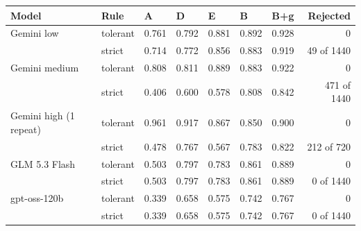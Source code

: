 \begin{tabularx}{\linewidth}{llYYYYYr}
\toprule
Model & Rule & A & D & E & B & B+g & Rejected \\
\midrule
Gemini low & tolerant & 0.761 & 0.792 & 0.881 & 0.892 & 0.928 & 0 \\
 & strict & 0.714 & 0.772 & 0.856 & 0.883 & 0.919 & 49 of 1440 \\
\addlinespace
Gemini medium & tolerant & 0.808 & 0.811 & 0.889 & 0.883 & 0.922 & 0 \\
 & strict & 0.406 & 0.600 & 0.578 & 0.808 & 0.842 & 471 of 1440 \\
\addlinespace
Gemini high (1 repeat) & tolerant & 0.961 & 0.917 & 0.867 & 0.850 & 0.900 & 0 \\
 & strict & 0.478 & 0.767 & 0.567 & 0.783 & 0.822 & 212 of 720 \\
\addlinespace
GLM 5.3 Flash & tolerant & 0.503 & 0.797 & 0.783 & 0.861 & 0.889 & 0 \\
 & strict & 0.503 & 0.797 & 0.783 & 0.861 & 0.889 & 0 of 1440 \\
\addlinespace
gpt-oss-120b & tolerant & 0.339 & 0.658 & 0.575 & 0.742 & 0.767 & 0 \\
 & strict & 0.339 & 0.658 & 0.575 & 0.742 & 0.767 & 0 of 1440 \\
\bottomrule
\end{tabularx}
